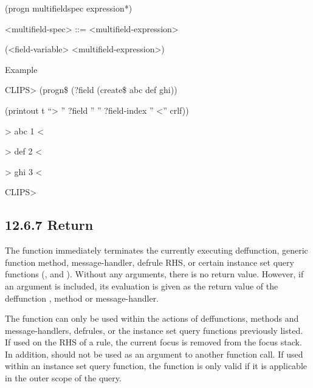 \documentclass[letterpaper,10pt,english]{sphinxmanual}
\begin{document}

\begin{sphinxVerbatim}[commandchars=\\\{\}]
(progn\PYGZdl{} \PYGZlt{}multifield\PYGZhy{}spec\PYGZgt{} \PYGZlt{}expression\PYGZgt{}*)
\end{sphinxVerbatim}

\textless{}multifield-spec\textgreater{} ::= \textless{}multifield-expression\textgreater{} \textbar{}

(\textless{}field-variable\textgreater{} \textless{}multifield-expression\textgreater{})

Example

CLIPS\textgreater{} (progn\$ (?field (create\$ abc def ghi))

(printout t “\textendash{}\textgreater{} ” ?field ” ” ?field-index ” \textless{}\textendash{}” crlf))

\textendash{}\textgreater{} abc 1 \textless{}\textendash{}

\textendash{}\textgreater{} def 2 \textless{}\textendash{}

\textendash{}\textgreater{} ghi 3 \textless{}\textendash{}

CLIPS\textgreater{}


\subsection{12.6.7 Return}
\label{\detokenize{actions:return}}
The  function immediately terminates the currently executing
deffunction, generic function method, message-handler, defrule RHS, or
certain instance set query functions (,
 and ). Without
any arguments, there is no return value. However, if an argument is
included, its evaluation is given as the return value of the deffunction
, method or message-handler.

The  function can only be used within the actions of
deffunctions, methods and message-handlers, defrules, or the instance
set query functions previously listed. If used on the RHS of a rule, the
current focus is removed from the focus stack. In addition, 
should not be used as an argument to another function call. If used
within an instance set query function, the  function is only
valid if it is applicable in the outer scope of the query.
\end{document}

